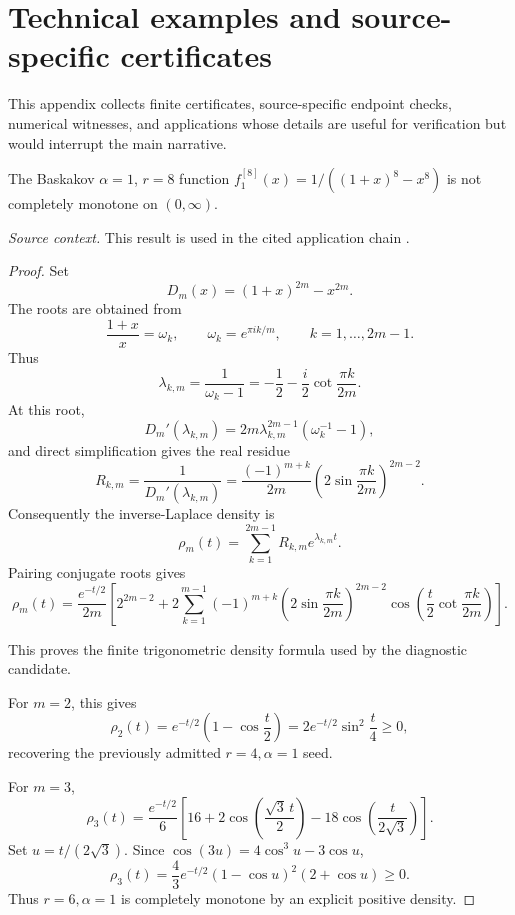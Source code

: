 \section{Technical examples and source-specific certificates}
This appendix collects finite certificates, source-specific endpoint checks, numerical witnesses, and applications whose details are useful for verification but would interrupt the main narrative.
\begin{counterexample}
\label{res:baskakov-alpha1-r8-not-cm}
The Baskakov \(\alpha=1\), \(r=8\) function \(f^{[8]}_1(x)=1/((1+x)^8-x^8)\) is not completely monotone on \((0,\infty)\).

\emph{Source context.} This result is used in the cited application chain \cite{abel-gawronski-neuschel}.
\end{counterexample}
\begin{proof}
Set
\[
D_m(x)=(1+x)^{2m}-x^{2m}.
\]
The roots are obtained from
\[
\frac{1+x}{x}=\omega_k,\qquad
\omega_k=e^{\pi i k/m},\qquad k=1,\ldots,2m-1.
\]
Thus
\[
\lambda_{k,m}
=\frac{1}{\omega_k-1}
=-\frac12-\frac{i}{2}\cot\frac{\pi k}{2m}.
\]
At this root,
\[
D_m'(\lambda_{k,m})
=2m\lambda_{k,m}^{2m-1}(\omega_k^{-1}-1),
\]
and direct simplification gives the real residue
\[
R_{k,m}
=\frac{1}{D_m'(\lambda_{k,m})}
=\frac{(-1)^{m+k}}{2m}
\left(2\sin\frac{\pi k}{2m}\right)^{2m-2}.
\]
Consequently the inverse-Laplace density is
\[
\rho_m(t)
=\sum_{k=1}^{2m-1}R_{k,m}e^{\lambda_{k,m}t}.
\]
Pairing conjugate roots gives
\[
\rho_m(t)
=\frac{e^{-t/2}}{2m}
\left[
2^{2m-2}
+2\sum_{k=1}^{m-1}
(-1)^{m+k}
\left(2\sin\frac{\pi k}{2m}\right)^{2m-2}
\cos\!\left(
\frac{t}{2}\cot\frac{\pi k}{2m}
\right)
\right].
\]

This proves the finite trigonometric density formula used by the diagnostic
candidate.

For \(m=2\), this gives
\[
\rho_2(t)=e^{-t/2}\left(1-\cos\frac t2\right)
=2e^{-t/2}\sin^2\frac t4\ge0,
\]
recovering the previously admitted \(r=4,\alpha=1\) seed.

For \(m=3\),
\[
\rho_3(t)
=\frac{e^{-t/2}}6
\left[
16+2\cos\left(\frac{\sqrt3\,t}{2}\right)
-18\cos\left(\frac{t}{2\sqrt3}\right)
\right].
\]
Set \(u=t/(2\sqrt3)\).  Since
\(\cos(3u)=4\cos^3u-3\cos u\),
\[
\rho_3(t)
=\frac{4}{3}e^{-t/2}(1-\cos u)^2(2+\cos u)\ge0.
\]
Thus \(r=6,\alpha=1\) is completely monotone by an explicit positive density.


\end{proof}
